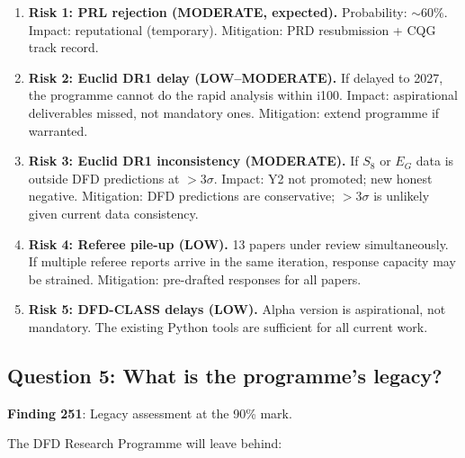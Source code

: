 \documentclass[11pt,a4paper]{article}
\begin{document}
\begin{enumerate}
\item \textbf{Risk 1: PRL rejection (MODERATE, expected).} Probability: $\sim 60\%$. Impact: reputational (temporary). Mitigation: PRD resubmission + CQG track record.

\item \textbf{Risk 2: Euclid DR1 delay (LOW--MODERATE).} If delayed to 2027, the programme cannot do the rapid analysis within i100. Impact: aspirational deliverables missed, not mandatory ones. Mitigation: extend programme if warranted.

\item \textbf{Risk 3: Euclid DR1 inconsistency (MODERATE).} If $S_8$ or $E_G$ data is outside DFD predictions at $> 3\sigma$. Impact: Y2 not promoted; new honest negative. Mitigation: DFD predictions are conservative; $> 3\sigma$ is unlikely given current data consistency.

\item \textbf{Risk 4: Referee pile-up (LOW).} 13 papers under review simultaneously. If multiple referee reports arrive in the same iteration, response capacity may be strained. Mitigation: pre-drafted responses for all papers.

\item \textbf{Risk 5: DFD-CLASS delays (LOW).} Alpha version is aspirational, not mandatory. The existing Python tools are sufficient for all current work.
\end{enumerate}

\subsection{Question 5: What is the programme's legacy?}

\textbf{Finding 251}: Legacy assessment at the 90\% mark.

The DFD Research Programme will leave behind:
\end{document}
